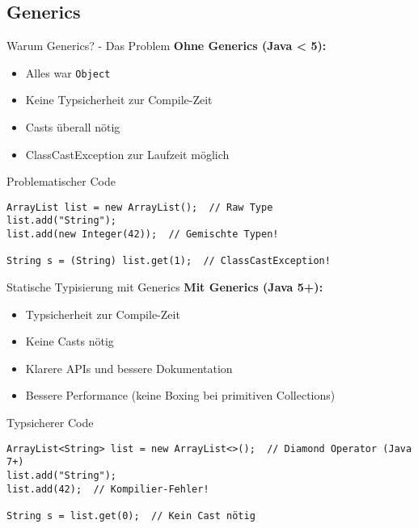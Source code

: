 
\subsection{Generics}

\begin{frame}[fragile]{Warum Generics? - Das Problem}
  \textbf{Ohne Generics (Java < 5):}
  \begin{itemize}
    \item Alles war \texttt{Object}
    \item Keine Typsicherheit zur Compile-Zeit
    \item Casts überall nötig
    \item ClassCastException zur Laufzeit möglich
  \end{itemize}

  \begin{alertblock}{Problematischer Code}
    \begin{lstlisting}[style=java, basicstyle=\footnotesize\ttfamily]
ArrayList list = new ArrayList();  // Raw Type
list.add("String");
list.add(new Integer(42));  // Gemischte Typen!

String s = (String) list.get(1);  // ClassCastException!
    \end{lstlisting}
  \end{alertblock}
\end{frame}

\begin{frame}[fragile]{Statische Typisierung mit Generics}
  \textbf{Mit Generics (Java 5+):}
  \begin{itemize}
    \item Typsicherheit zur Compile-Zeit
    \item Keine Casts nötig
    \item Klarere APIs und bessere Dokumentation
    \item Bessere Performance (keine Boxing bei primitiven Collections)
  \end{itemize}

  \begin{exampleblock}{Typsicherer Code}
    \begin{lstlisting}[style=java, basicstyle=\footnotesize\ttfamily]
ArrayList<String> list = new ArrayList<>();  // Diamond Operator (Java 7+)
list.add("String");
list.add(42);  // Kompilier-Fehler!

String s = list.get(0);  // Kein Cast nötig
    \end{lstlisting}
  \end{exampleblock}
\end{frame}

